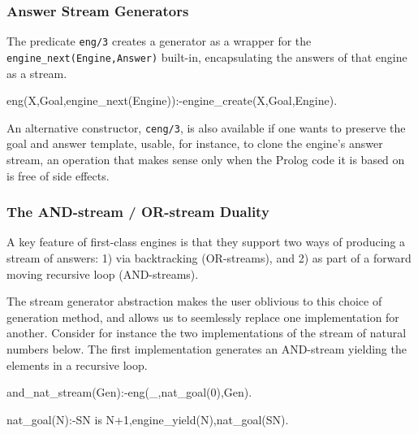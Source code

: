 \documentclass{new_tlp}
\begin{document}
\begin{comment}
As Prolog virtual machines, engines have  an internal state. Thus interacting with them requires a concise and expressive, but ultimately procedural API. This is not very different from what working with attributed variables, instrumental to adding constraint solvers, requires.
\end{comment}

\subsubsection{Answer Stream Generators}

The predicate {\tt eng/3} creates a generator as a wrapper for the {\tt
engine\_next(Engine,Answer)} built-in, encapsulating the answers of that engine
as a stream.
\begin{code}
eng(X,Goal,engine_next(Engine)):-engine_create(X,Goal,Engine). 
\end{code}
An alternative constructor, {\tt ceng/3}, is also available if one wants to preserve
the goal and answer template, usable, for instance, to clone
the engine's answer stream, an
operation that makes sense only when the Prolog code it is based on 
is free of side effects.

\subsubsection{The AND-stream / OR-stream Duality}

A key feature of first-class engines is that they support two ways of producing
a stream of answers: 1) via backtracking (OR-streams), and 2) as part of a
forward moving recursive loop (AND-streams).

The stream generator abstraction makes the user oblivious to this choice of
generation method, and allows us to seemlessly replace one implementation 
for another. Consider for instance the two implementations of the stream of natural
numbers below.
The first implementation generates an AND-stream yielding the elements in a
recursive loop.
\begin{code}
and_nat_stream(Gen):-eng(_,nat_goal(0),Gen).

nat_goal(N):-SN is N+1,engine_yield(N),nat_goal(SN).
\end{code}
\end{document}
